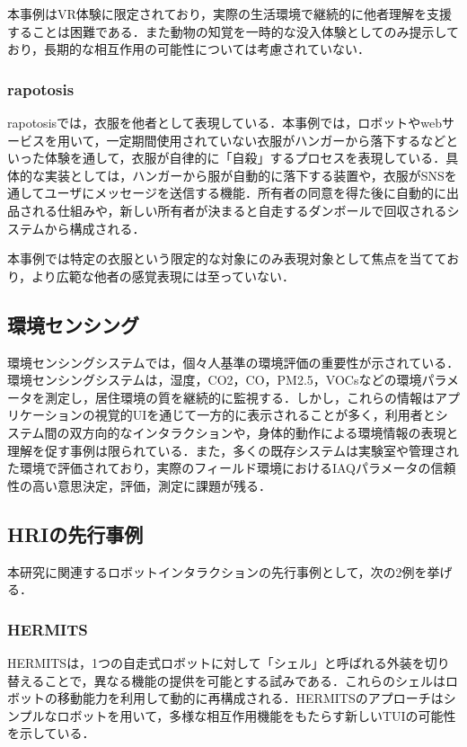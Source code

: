 \documentclass{cuxarticle}
\begin{document}
本事例はVR体験に限定されており，実際の生活環境で継続的に他者理解を支援することは困難である．また動物の知覚を一時的な没入体験としてのみ提示しており，長期的な相互作用の可能性については考慮されていない．

\subsubsection{rapotosis}
rapotosis\cite{--ソンヨン}では，衣服を他者として表現している．本事例では，ロボットやwebサービスを用いて，一定期間使用されていない衣服がハンガーから落下するなどといった体験を通して，衣服が自律的に「自殺」するプロセスを表現している．具体的な実装としては，ハンガーから服が自動的に落下する装置や，衣服がSNSを通してユーザにメッセージを送信する機能．所有者の同意を得た後に自動的に出品される仕組みや，新しい所有者が決まると自走するダンボールで回収されるシステムから構成される．

本事例では特定の衣服という限定的な対象にのみ表現対象として焦点を当てており，より広範な他者の感覚表現には至っていない．

\subsection{環境センシング}
環境センシングシステムでは，個々人基準の環境評価の重要性が示されている\cite{Saini-2020-IndoorAirQualityMonitoring}．環境センシングシステムは，湿度，CO2，CO，PM2.5，VOCsなどの環境パラメータを測定し，居住環境の質を継続的に監視する．しかし，これらの情報はアプリケーションの視覚的UIを通じて一方的に表示されることが多く，利用者とシステム間の双方向的なインタラクションや，身体的動作による環境情報の表現と理解を促す事例は限られている．また，多くの既存システムは実験室や管理された環境で評価されており，実際のフィールド環境におけるIAQパラメータの信頼性の高い意思決定，評価，測定に課題が残る．

\subsection{HRIの先行事例}
本研究に関連するロボットインタラクションの先行事例として，次の2例を挙げる．

\subsubsection{HERMITS}
HERMITS\cite{--HERMITSProceedings33rdAnnual}は，1つの自走式ロボットに対して「シェル」と呼ばれる外装を切り替えることで，異なる機能の提供を可能とする試みである．これらのシェルはロボットの移動能力を利用して動的に再構成される．HERMITSのアプローチはシンプルなロボットを用いて，多様な相互作用機能をもたらす新しいTUIの可能性を示している．
\end{document}
